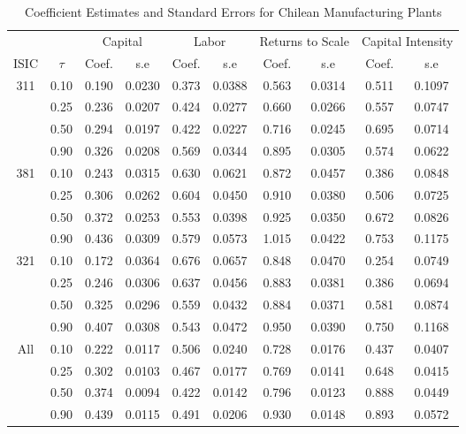 \documentclass[11pt]{article}
\begin{document}
\begin{table}[H]
\centering
\caption{Coefficient Estimates and Standard Errors for Chilean Manufacturing Plants}
\begin{tabular}{cccccccccc}
  \hline\hline & & \multicolumn{2}{c}{Capital}  & \multicolumn{2}{c}{Labor} & \multicolumn{2}{c}{Returns to Scale} & \multicolumn{2}{c}{Capital Intensity}\\ \cmidrule(lr){3-4} \cmidrule(lr){5-6} \cmidrule(lr){7-8} \cmidrule(lr){9-10}ISIC & $\tau$ & Coef. & s.e & Coef. & s.e & Coef. & s.e & Coef. & s.e \\ 
  \hline
311 & 0.10 & 0.190 & 0.0230 & 0.373 & 0.0388 & 0.563 & 0.0314 & 0.511 & 0.1097 \\ 
   & 0.25 & 0.236 & 0.0207 & 0.424 & 0.0277 & 0.660 & 0.0266 & 0.557 & 0.0747 \\ 
   & 0.50 & 0.294 & 0.0197 & 0.422 & 0.0227 & 0.716 & 0.0245 & 0.695 & 0.0714 \\ 
   & 0.90 & 0.326 & 0.0208 & 0.569 & 0.0344 & 0.895 & 0.0305 & 0.574 & 0.0622 \\ 
  381 & 0.10 & 0.243 & 0.0315 & 0.630 & 0.0621 & 0.872 & 0.0457 & 0.386 & 0.0848 \\ 
   & 0.25 & 0.306 & 0.0262 & 0.604 & 0.0450 & 0.910 & 0.0380 & 0.506 & 0.0725 \\ 
   & 0.50 & 0.372 & 0.0253 & 0.553 & 0.0398 & 0.925 & 0.0350 & 0.672 & 0.0826 \\ 
   & 0.90 & 0.436 & 0.0309 & 0.579 & 0.0573 & 1.015 & 0.0422 & 0.753 & 0.1175 \\ 
  321 & 0.10 & 0.172 & 0.0364 & 0.676 & 0.0657 & 0.848 & 0.0470 & 0.254 & 0.0749 \\ 
   & 0.25 & 0.246 & 0.0306 & 0.637 & 0.0456 & 0.883 & 0.0381 & 0.386 & 0.0694 \\ 
   & 0.50 & 0.325 & 0.0296 & 0.559 & 0.0432 & 0.884 & 0.0371 & 0.581 & 0.0874 \\ 
   & 0.90 & 0.407 & 0.0308 & 0.543 & 0.0472 & 0.950 & 0.0390 & 0.750 & 0.1168 \\ 
  All & 0.10 & 0.222 & 0.0117 & 0.506 & 0.0240 & 0.728 & 0.0176 & 0.437 & 0.0407 \\ 
   & 0.25 & 0.302 & 0.0103 & 0.467 & 0.0177 & 0.769 & 0.0141 & 0.648 & 0.0415 \\ 
   & 0.50 & 0.374 & 0.0094 & 0.422 & 0.0142 & 0.796 & 0.0123 & 0.888 & 0.0449 \\ 
   & 0.90 & 0.439 & 0.0115 & 0.491 & 0.0206 & 0.930 & 0.0148 & 0.893 & 0.0572 \\ 
   \hline
\end{tabular}
\label{CHLestLP}
\end{table}
\end{document}
